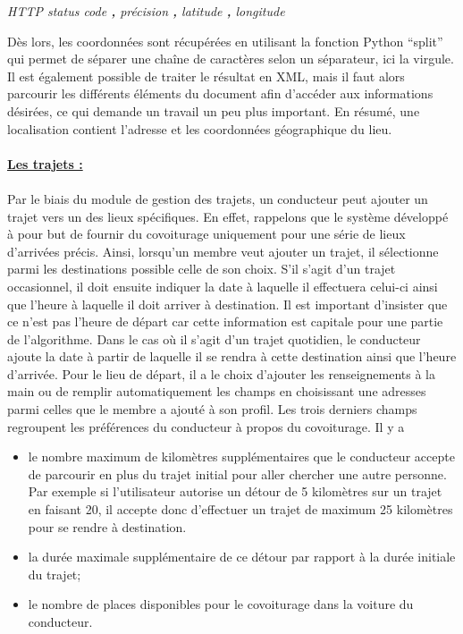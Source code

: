\documentclass[12pt, a4paper, oneside]{article}
\begin{document}
    \begin{center}
        \textit{HTTP status code \textbf{,} précision \textbf{,} latitude \textbf{,} longitude}
    \end{center}
    Dès lors, les coordonnées sont récupérées en utilisant la fonction Python ``split'' ~\cite{python-split} qui permet de séparer une chaîne de caractères selon un séparateur, ici la virgule. Il est également possible de traiter le résultat en XML, mais il faut alors parcourir les différents éléments du document afin d'accéder aux informations désirées, ce qui demande un travail un peu plus important. En résumé, une localisation contient l'adresse et les coordonnées géographique du lieu.\\\\
    \underline{\textbf{Les trajets :}}\\\\
    \indent Par le biais du module de gestion des trajets, un conducteur peut ajouter un trajet vers un des lieux spécifiques. En effet, rappelons que le système développé à pour but de fournir du covoiturage uniquement pour une série de lieux d'arrivées précis. Ainsi, lorsqu'un membre veut ajouter un trajet, il sélectionne parmi les destinations possible celle de son choix. S'il s'agit d'un trajet occasionnel, il doit ensuite indiquer la date à laquelle il effectuera celui-ci ainsi que l'heure à laquelle il doit arriver à destination. Il est important d'insister que ce n'est pas l'heure de départ car cette information est capitale pour une partie de l'algorithme. Dans le cas où il s'agit d'un trajet quotidien, le conducteur ajoute la date à partir de laquelle il se rendra à cette destination ainsi que l'heure d'arrivée. Pour le lieu de départ, il a le choix d'ajouter les renseignements à la main ou de remplir automatiquement les champs en choisissant une adresses parmi celles que le membre a ajouté à son profil. Les trois derniers champs regroupent les préférences du conducteur à propos du covoiturage. Il y a \\
    \begin{itemize}
        \item le nombre maximum de kilomètres supplémentaires que le conducteur accepte de parcourir en plus du trajet initial pour aller chercher une autre personne. Par exemple si l'utilisateur autorise un détour de 5 kilomètres sur un trajet en faisant 20, il accepte donc d'effectuer un trajet de maximum 25 kilomètres pour se rendre à destination.\\
        \item la durée maximale supplémentaire de ce détour par rapport à la durée initiale du trajet;\\
        \item le nombre de places disponibles pour le covoiturage dans la voiture du conducteur.\\
    \end{itemize}
\end{document}
